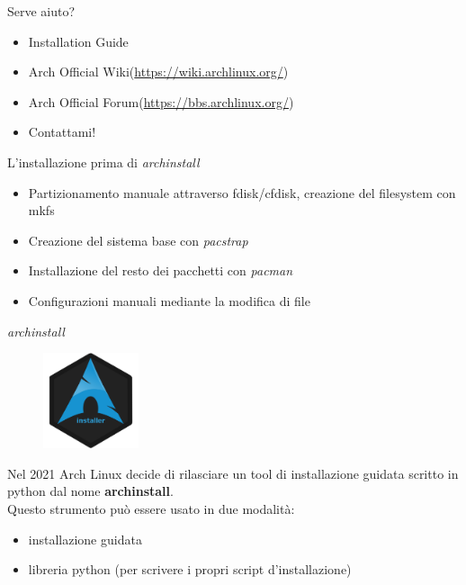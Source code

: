 \begin{frame}{Serve aiuto?}
    \begin{itemize}
        \item Installation Guide
        \item Arch Official Wiki(\url{https://wiki.archlinux.org/})
        \item Arch Official Forum(\url{https://bbs.archlinux.org/})
        \item Contattami!
    \end{itemize}
\end{frame}

\begin{frame}{L'installazione prima di \textit{archinstall}}
    \begin{itemize}
        \item Partizionamento manuale attraverso fdisk/cfdisk, creazione del filesystem con mkfs
        \item Creazione del sistema base con \textit{pacstrap}
        \item Installazione del resto dei pacchetti con \textit{pacman}
        \item Configurazioni manuali mediante la modifica di file
    \end{itemize}
\end{frame}

\begin{frame}{\textit{archinstall}}
    \begin{figure}[h]
        \includegraphics[width=0.25\textwidth]{images/archinstall.png}
    \end{figure}
Nel 2021 Arch Linux decide di rilasciare un tool di installazione guidata scritto in python dal nome \textbf{archinstall}. \\
Questo strumento può essere usato in due modalità:
    \begin{itemize}
        \item installazione guidata
        \item libreria python (per scrivere i propri script d'installazione)
    \end{itemize}
\end{frame}

